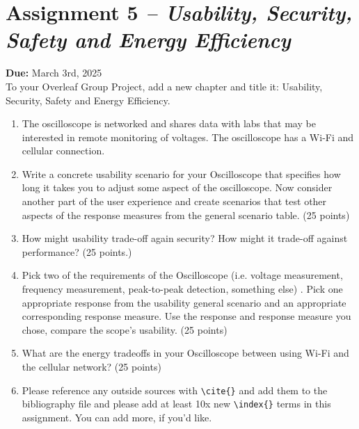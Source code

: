 \section{Assignment 5 \textit{-- Usability, Security, Safety and Energy Efficiency}}\label{Assignments::5}
\textbf{Due:} March 3rd, 2025 \\

\noindent
To your Overleaf Group Project, add a new chapter and title it: Usability, Security, Safety and Energy Efficiency.

\begin{enumerate}
    \item The oscilloscope is networked and shares data with labs that may be interested in remote monitoring of voltages.  The oscilloscope has a Wi-Fi and cellular connection.
    \item Write a concrete usability scenario for your Oscilloscope that specifies how long it takes you to adjust some aspect of the oscilloscope. Now consider another part of the user experience and create scenarios that test other aspects of the response measures from the general scenario table. (25 points)
    \item How might usability trade-off again security? How might it trade-off against performance? (25 points.)
    \item Pick two of the requirements of the Oscilloscope (i.e. voltage measurement, frequency measurement, peak-to-peak detection, something else) . Pick one appropriate response from the usability general scenario and an appropriate corresponding response measure. Use the response and response measure you chose, compare the scope's usability.  (25 points)
    \item What are the energy tradeoffs in your Oscilloscope between using Wi-Fi and the cellular network? (25 points)
    \item Please reference any outside sources with \verb|\cite{}| and add them to the bibliography file and please add at least 10x new \verb|\index{}| terms in this assignment.  You can add more, if you'd like.
\end{enumerate}